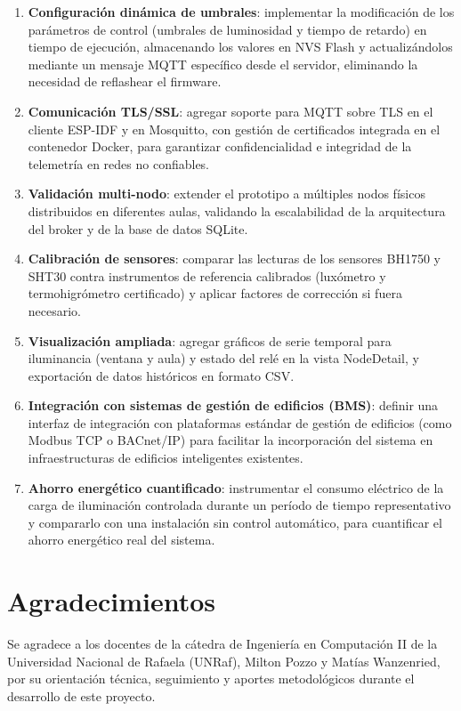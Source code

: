 \begin{enumerate}
  \item \textbf{Configuración dinámica de umbrales}: implementar la modificación
        de los parámetros de control (umbrales de luminosidad y tiempo de retardo)
        en tiempo de ejecución, almacenando los valores en NVS Flash y
        actualizándolos mediante un mensaje MQTT específico desde el servidor,
        eliminando la necesidad de reflashear el firmware.

  \item \textbf{Comunicación TLS/SSL}: agregar soporte para MQTT sobre TLS en el
        cliente ESP-IDF y en Mosquitto, con gestión de certificados integrada en el
        contenedor Docker, para garantizar confidencialidad e integridad de la
        telemetría en redes no confiables.

  \item \textbf{Validación multi-nodo}: extender el prototipo a múltiples nodos
        físicos distribuidos en diferentes aulas, validando la escalabilidad de la
        arquitectura del broker y de la base de datos SQLite.

  \item \textbf{Calibración de sensores}: comparar las lecturas de los sensores
        BH1750 y SHT30 contra instrumentos de referencia calibrados (luxómetro y
        termohigrómetro certificado) y aplicar factores de corrección si fuera
        necesario.

  \item \textbf{Visualización ampliada}: agregar gráficos de serie temporal para
        iluminancia (ventana y aula) y estado del relé en la vista NodeDetail, y
        exportación de datos históricos en formato CSV.

  \item \textbf{Integración con sistemas de gestión de edificios (BMS)}: definir
        una interfaz de integración con plataformas estándar de gestión de
        edificios (como Modbus TCP o BACnet/IP) para facilitar la incorporación del
        sistema en infraestructuras de edificios inteligentes existentes.

  \item \textbf{Ahorro energético cuantificado}: instrumentar el consumo eléctrico
        de la carga de iluminación controlada durante un período de tiempo
        representativo y compararlo con una instalación sin control automático, para
        cuantificar el ahorro energético real del sistema.
\end{enumerate}

\section*{Agradecimientos}

Se agradece a los docentes de la cátedra de Ingeniería en Computación II de la
Universidad Nacional de Rafaela (UNRaf), Milton Pozzo y Matías Wanzenried,
por su orientación técnica, seguimiento y aportes metodológicos durante el
desarrollo de este proyecto.

